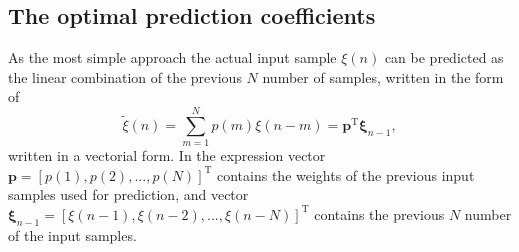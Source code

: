 \subsection{The optimal prediction coefficients}
As the most simple approach the actual input sample $\xi(n)$ can be predicted as the linear combination of the previous $N$ number of samples, written in the form of
\begin{equation}
\tilde{\xi}(n) = \sum_{m=1}^N p(m) \xi(n-m) = \mathbf{p}^{\mathrm{T}} \mathbf{\xi}_{n-1},
\label{Eq:lin_pred}
\end{equation}
written in a vectorial form.
In the expression vector $\mathbf{p} = [p(1), p(2),...,p(N)]^{\mathrm{T}}$ contains the weights of the previous input samples used for prediction, and vector $\mathbf{\xi}_{n-1} = [\xi(n-1),\xi(n-2),...,\xi(n-N)]^{\mathrm{T}}$ contains the previous $N$ number of the input samples.

